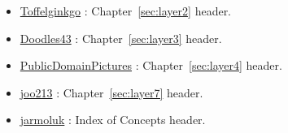\begin{itemize}
\item \href{https://commons.wikimedia.org/wiki/File:Winter_2004_DreamHack_LAN_Party.jpg}{Toffelginkgo} : Chapter~\ref{sec:layer2} header.
\item \href{https://pixabay.com/photos/golden-gate-bridge-san-francisco-1549662/}{Doodles43} : Chapter~\ref{sec:layer3} header.
\item \href{https://pixabay.com/photos/green-plastic-pipes-culvert-water-72772/}{PublicDomainPictures} : Chapter~\ref{sec:layer4} header.
\item \href{https://pixabay.com/vectors/logo-icon-icon-collection-flat-1727647/}{joo213} : Chapter~\ref{sec:layer7} header.
\item \href{https://pixabay.com/photos/list-surnames-table-personal-data-428312/}{jarmoluk} : Index of Concepts header.
\end{itemize}

\vfill

